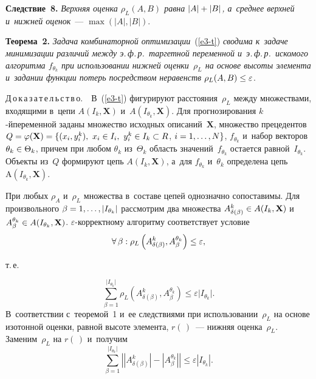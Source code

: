 \begin{multicols}{2}
\noindent
\textbf{Следствие~8.} \textit{Верхняя оценка $\rho_L({A},{B})$ 
равна $\vert {A}\vert \hm+ \vert {B}\vert$, а~среднее верхней 
и~нижней оценок}~--- $\max(\vert {A}\vert,\vert {B}\vert)$.


\smallskip

\noindent
\textbf{Теорема~2.} \textit{Задача комбинаторной оптимизации}~(\ref{e3-t}) 
\textit{сводима к~задаче минимизации различий между э.\,ф.\,р.\ таргетной 
переменной и~э.\,ф.\,р.\ искомого алгоритма $f_{\theta_k}$ при использовании 
нижней оценки~$\rho_L$ на основе высоты элемента и~задании функции 
потерь посредством неравенств} $\rho_L({A},{B}) \hm\leq 
\varepsilon$.

\smallskip

\noindent
     Д\,о\,к\,а\,з\,а\,т\,е\,л\,ь\,с\,т\,в\,о.\ \ В~(\ref{e3-t}) фигурируют 
расстояния~$\rho_L$ между множествами, входящими в~цепи 
${A}(I_k,\mathbf{X})$ и~${A}(I_{\theta_k}, \mathbf{X})$. Для 
прогнозирования $k$-й\linebreak переменной заданы множество исходных 
описаний~$\mathbf{X}$, множество прецедентов 
$Q\hm=\varphi(\mathbf{X})\hm=\{(x_i,  y_i^k),\ x_i\hm\in I_i,\ y_i^k\hm\in 
I_k\hm\subset R$, $i\hm=1,\ldots ,N\}$, $f_{\theta_k}$ и~набор векторов 
$\theta_k\hm\in \Theta_k$, причем при любом $\theta_k$ из~$\Theta_k$ об\-ласть 
значений~$f_{\theta_k}$ остается равной~$I_{\theta_k}$. Объекты из~$Q$ 
формируют цепь ${A}(I_k,\mathbf{X})$, а~для $f_{\theta_k}$ 
и~$\theta_k$ определена цепь $\mathrm{A}(I_{\theta_k},\mathbf{X})$. 
     
     При любых $\rho_A$ и~$\rho_L$ множества в~составе цепей однозначно 
сопоставимы. Для произвольного $\beta\hm= 1,\ldots, \vert I_{\theta_k}\vert$ 
рассмотрим два множества $A^k_{\delta(\beta)}\hm\in 
{A}(I_k,\mathbf{X})$ и~$A_\beta^{\theta_k} \hm\in 
{A}(I_{\theta_k},\mathbf{X})$. $\varepsilon$-кор\-рек\-тно\-му 
алгоритму соответствует условие 
$$
\forall\,\beta: \rho_L\left(A^k_{\delta(\beta)}, 
A_\beta^{\theta_k}\right)\hm\leq \varepsilon,
$$

\vspace*{-3pt}

\noindent
 т.\,е.\ 
 
 \vspace*{-3pt}

\noindent
$$
\sum\limits_{\beta=1}^{\vert I_{\theta_k}\vert} \rho_L \left( 
A^k_{\delta(\beta)}, A^{\theta_k}_\beta\right) \leq \varepsilon\vert 
I_{\theta_k}\vert.
$$
 В~соответствии с~теоремой~1 и~ее следствиями при 
использовании~$\rho_L$ на основе изотонной оценки, равной высоте элемента, 
$r(\,)$~--- нижняя оценка~$\rho_L$. Заменим~$\rho_L$ на $r(\,)$ и~получим
$$
     \sum\limits_{\beta=1}^{\vert I_{\theta_k}\vert}\left\vert\left\vert 
A^k_{\delta(\beta)} \right\vert - \left\vert A_\beta^{\theta_k}\right\vert \right\vert 
\leq \varepsilon\left\vert I_{\theta_k}\right\vert.
$$


\end{multicols}
